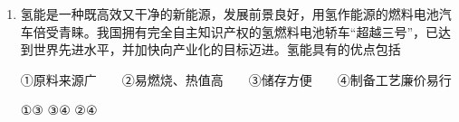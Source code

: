 \documentclass[\gkver]{gaokaozhenti}
\begin{document}
\begin{enumerate}
{\begin{enumerate}
	\item
	D

	\item
	$\beta$；$\gamma$

\end{enumerate}
}

\item
氢能是一种既高效又干净的新能源，发展前景良好，用氢作能源的燃料电池汽车倍受青睐。我国拥有完全自主知识产权的氢燃料电池轿车“超越三号”，已达到世界先进水平，并加快向产业化的目标迈进。氢能具有的优点包括

①原料来源广　　②易燃烧、热值高　　③储存方便　　④制备工艺廉价易行

{①③}
{③④}
{②④}


\end{enumerate}
\end{document}
